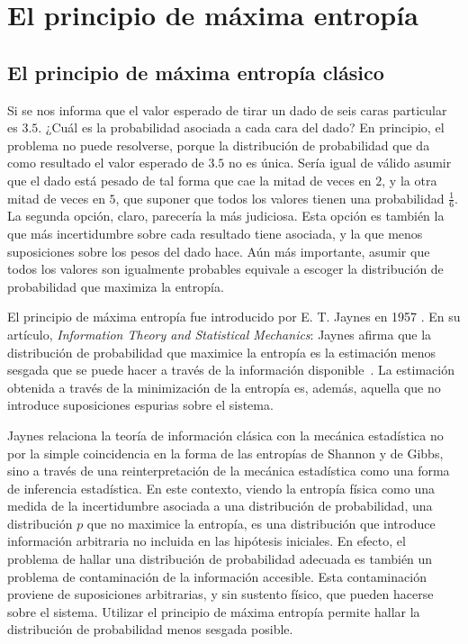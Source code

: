 \section{El principio de máxima entropía}\label{sec:CH1MaxEnt}



\subsection{El principio de máxima entropía clásico}

Si se nos informa que el valor esperado de tirar un dado de seis caras particular es $3.5$. ¿Cuál es la probabilidad asociada a cada cara del dado? En principio, el problema no puede resolverse, porque la distribución de probabilidad que da como resultado el valor esperado de $3.5$ no es única. Sería igual de válido asumir que el dado está pesado de tal forma que cae la mitad de veces en $2$, y la otra mitad de veces en $5$, que suponer que todos los valores tienen una probabilidad $\frac{1}{6}$. La segunda opción, claro, parecería la más judiciosa. Esta opción es también la que más incertidumbre sobre cada resultado tiene asociada, y la que menos suposiciones sobre los pesos del dado hace. Aún más importante, asumir que todos los valores son igualmente probables equivale a escoger la distribución de probabilidad que maximiza la entropía.


El principio de máxima entropía fue introducido por E. T. Jaynes en 1957 \cite{JaynesI}. En su artículo, \textit{Information Theory and Statistical Mechanics}: Jaynes afirma que la distribución de probabilidad que maximice la entropía es la estimación menos sesgada que se puede hacer a través de la información disponible~\cite{JaynesI}. La estimación obtenida a través de la minimización de la entropía es, además, aquella que no introduce suposiciones espurias sobre el sistema.

Jaynes relaciona la teoría de información clásica con la mecánica estadística no por la simple coincidencia en la forma de las entropías de Shannon y de Gibbs, sino a través de una reinterpretación de la mecánica estadística como una forma de inferencia estadística. En este contexto, viendo la entropía física como una medida de la incertidumbre asociada a una distribución de probabilidad, una distribución $p$ que no maximice la entropía, es una distribución que introduce información arbitraria no incluida en las hipótesis iniciales. En efecto, el problema de hallar una distribución de probabilidad adecuada es también un problema de contaminación de la información accesible. Esta contaminación proviene de suposiciones arbitrarias, y sin sustento físico, que pueden hacerse sobre el sistema. Utilizar el principio de máxima entropía permite hallar la distribución de probabilidad menos sesgada posible.

